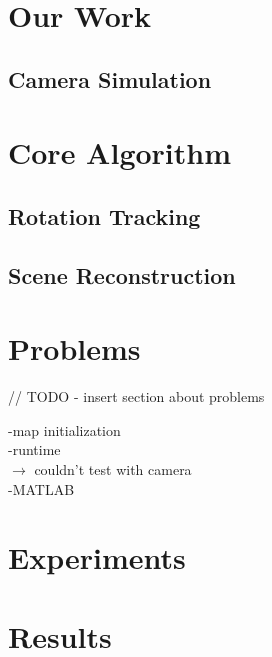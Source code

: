 \documentclass[10pt,twocolumn,letterpaper]{article}
\begin{document}
\section{Our Work}
\label{sec:our_work}


\subsection{Camera Simulation}
\label{sec:simulation}



\section{Core Algorithm}
\label{sec:core_algorithm}


\subsection{Rotation Tracking}
\label{sec:tracking}


\subsection{Scene Reconstruction}
\label{sec:scene_reconstruction}



\section{Problems}
\label{sec:problems}
// TODO - insert section about problems

-map initialization\\
-runtime\\
$\rightarrow$ couldn't test with camera\\
-MATLAB\\


\section{Experiments}
\label{sec:experiments}



\section{Results}
\label{sec:results}



{\small


}
\end{document}
